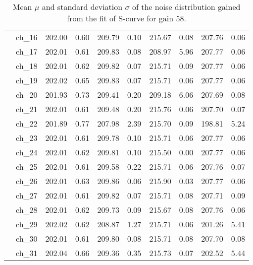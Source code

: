 \begin{table}[H]
{\begin{tabular}{|c|c|c|c|c|c|c|c|c|c|}
    &ch\_16 & 202.00 & 0.60 & 209.79 & 0.10 & 215.67 & 0.08 & 207.76 & 0.06 \\
    &ch\_17 & 202.01 & 0.61 & 209.83 & 0.08 & 208.97 & 5.96 & 207.77 & 0.06 \\
    &ch\_18 & 202.01 & 0.62 & 209.82 & 0.07 & 215.71 & 0.09 & 207.77 & 0.06 \\
    &ch\_19 & 202.02 & 0.65 & 209.83 & 0.07 & 215.71 & 0.06 & 207.77 & 0.06 \\
    &ch\_20 & 201.93 & 0.73 & 209.41 & 0.20 & 209.18 & 6.06 & 207.69 & 0.08 \\
    &ch\_21 & 202.01 & 0.61 & 209.48 & 0.20 & 215.76 & 0.06 & 207.70 & 0.07 \\
    &ch\_22 & 201.89 & 0.77 & 207.98 & 2.39 & 215.70 & 0.09 & 198.81 & 5.24 \\
    &ch\_23 & 202.01 & 0.61 & 209.78 & 0.10 & 215.71 & 0.06 & 207.77 & 0.06 \\
    &ch\_24 & 202.01 & 0.62 & 209.81 & 0.10 & 215.50 & 0.00 & 207.77 & 0.06 \\
    &ch\_25 & 202.01 & 0.61 & 209.58 & 0.22 & 215.71 & 0.06 & 207.76 & 0.07 \\
    &ch\_26 & 202.01 & 0.63 & 209.86 & 0.06 & 215.90 & 0.03 & 207.77 & 0.06 \\
    &ch\_27 & 202.01 & 0.61 & 209.82 & 0.07 & 215.71 & 0.08 & 207.71 & 0.09 \\
    &ch\_28 & 202.01 & 0.62 & 209.73 & 0.09 & 215.67 & 0.08 & 207.76 & 0.06 \\
    &ch\_29 & 202.02 & 0.62 & 208.87 & 1.27 & 215.71 & 0.06 & 201.26 & 5.41 \\
    &ch\_30 & 202.01 & 0.61 & 209.80 & 0.08 & 215.71 & 0.08 & 207.70 & 0.08 \\
    &ch\_31 & 202.04 & 0.66 & 209.36 & 0.35 & 215.73 & 0.07 & 202.52 & 5.44 \\
    \hline
     
\end{tabular}
}
\caption{Mean $\mu$ and standard deviation $\sigma$ of the noise distribution gained from the fit of S-curve for gain 58.}

\end{table}


